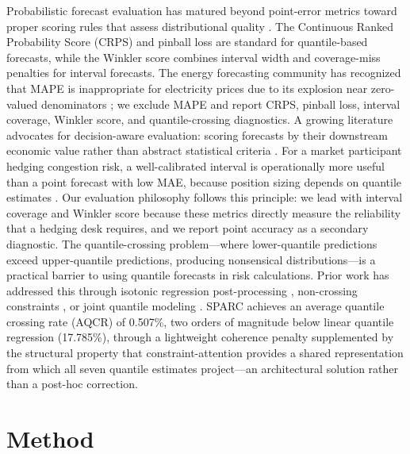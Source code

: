 \documentclass[twoside]{article}
\begin{document}
Probabilistic forecast evaluation has matured beyond point-error metrics toward proper scoring rules that assess distributional quality \cite{gneiting2007strictly}. The Continuous Ranked Probability Score (CRPS) \cite{matheson1976scoring} and pinball loss \cite{koenker1978regression} are standard for quantile-based forecasts, while the Winkler score \cite{winkler1972decision} combines interval width and coverage-miss penalties for interval forecasts. The energy forecasting community has recognized that MAPE is inappropriate for electricity prices due to its explosion near zero-valued denominators \cite{lago2020forecasting}; we exclude MAPE and report CRPS, pinball loss, interval coverage, Winkler score, and quantile-crossing diagnostics.
A growing literature advocates for decision-aware evaluation: scoring forecasts by their downstream economic value rather than abstract statistical criteria \cite{hobbs2022probabilistic, bunn2020statistical}. For a market participant hedging congestion risk, a well-calibrated interval is operationally more useful than a point forecast with low MAE, because position sizing depends on quantile estimates \cite{hirsch2026probabilistic}. Our evaluation philosophy follows this principle: we lead with interval coverage and Winkler score because these metrics directly measure the reliability that a hedging desk requires, and we report point accuracy as a secondary diagnostic.
The quantile-crossing problem---where lower-quantile predictions exceed upper-quantile predictions, producing nonsensical distributions---is a practical barrier to using quantile forecasts in risk calculations. Prior work has addressed this through isotonic regression post-processing \cite{lipiecki2024postprocessing}, non-crossing constraints \cite{chen2025outlieradaptivebased}, or joint quantile modeling \cite{taieb2020hierarchical}. SPARC achieves an average quantile crossing rate (AQCR) of 0.507\%, two orders of magnitude below linear quantile regression (17.785\%), through a lightweight coherence penalty supplemented by the structural property that constraint-attention provides a shared representation from which all seven quantile estimates project---an architectural solution rather than a post-hoc correction.
\section{Method}
\end{document}
